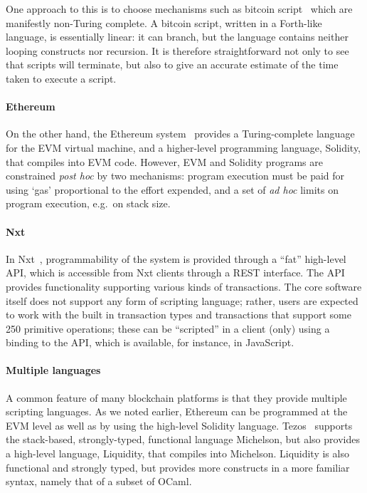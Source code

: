 \documentclass[runningheads]{llncs}
\begin{document}
One approach to this is to choose mechanisms such as bitcoin script~\cite{BitcoinWikiScript} which are manifestly 
non-Turing complete. A bitcoin script, written in a Forth-like language, is essentially linear: it can branch, but the 
language contains neither looping constructs nor recursion. It is therefore straightforward not only to see that scripts 
will terminate, but also to give an accurate estimate of the time taken to execute a script. 

\paragraph{Ethereum}

On the other hand, the Ethereum system~\cite{wood2014ethereum} provides a Turing-complete language for the EVM virtual 
machine, and a higher-level programming language, Solidity, that compiles into EVM code. However, EVM and Solidity 
programs are constrained \emph{post hoc} by two mechanisms: program execution must be paid for using `gas' proportional 
to the effort expended, and a set of \emph{ad hoc} limits on program execution, e.g.\ on stack size.

\paragraph{Nxt}

In Nxt~\cite{Nxt}, programmability of the system is provided through a ``fat'' high-level 
API, which is accessible from Nxt clients through a REST interface. The API provides functionality supporting various 
kinds of transactions. The core software itself does not support any form of scripting language; rather, users are 
expected to work with the built in transaction types and transactions that support some 250 primitive operations; these 
can be ``scripted'' in a client (only) using a binding to the API, which is available, for instance, in JavaScript.

\paragraph{Multiple languages}

A common feature of many blockchain platforms is that they provide multiple scripting languages. As we noted earlier, 
Ethereum can be programmed at the EVM level as well as by using the high-level Solidity language. 
Tezos~\cite{tezos-white-paper} supports the stack-based, strongly-typed, functional language Michelson, but also 
provides a high-level language, Liquidity, that compiles into Michelson. Liquidity is also functional and strongly 
typed, but provides more constructs in a more familiar syntax, namely that of a subset of OCaml. 
\end{document}
